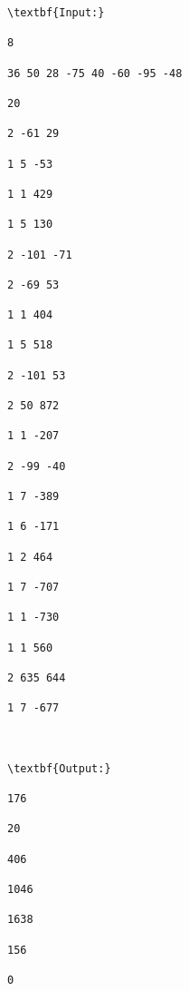 \begin{verbatim}
\textbf{Input:}

8

36 50 28 -75 40 -60 -95 -48

20

2 -61 29

1 5 -53

1 1 429

1 5 130

2 -101 -71

2 -69 53

1 1 404

1 5 518

2 -101 53

2 50 872

1 1 -207

2 -99 -40

1 7 -389

1 6 -171

1 2 464

1 7 -707

1 1 -730

1 1 560

2 635 644

1 7 -677



\textbf{Output:}

176

20

406

1046

1638

156

0

\end{verbatim}